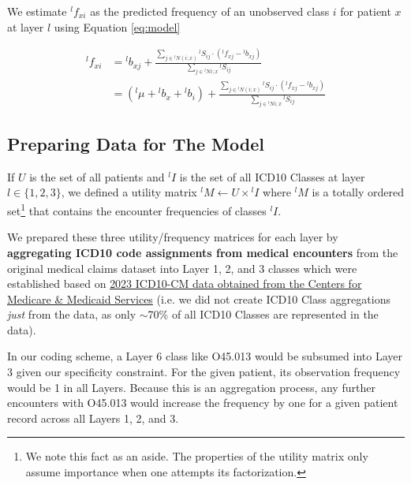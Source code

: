 \documentclass[twoside,11pt]{article}
\begin{document}
{We estimate ${}^{l}f_{xi}$ as the predicted frequency of an unobserved class $i$ for patient $x$ at layer $l$ using Equation \ref{eq:model}

\begin{equation}
\begin{align*}
{}^{l}f_{xi}
&= {}^{l}b_{xj} + \frac{
  \sum_{j \in {}^{l}N(i;x)} {}^{l}S_{ij} \cdot ({}^{l}f_{xj} - {}^{l}b_{xj})
 }{
  \sum_{j \in {}^{l}N{i;x}} {}^{l}S_{ij}
 } \\
&= ({}^{l}\mu + {}^{l}b_x + {}^{l}b_{i}) + \frac{
  \sum_{j \in {}^{l}N(i;x)} {}^{l}S_{ij} \cdot ({}^{l}f_{xj} - {}^{l}b_{xj})
 }{
  \sum_{j \in {}^{l}N{i;x}} {}^{l}S_{ij}
 }
\end{align*}
\label{eq:model}
\end{equation}


\subsection{Preparing Data for The Model} \label{section:data-prep}

If $U$ is the set of all patients and ${}^{l}I$ is the set of all ICD10 Classes at layer $l \in \{1,2,3\}$, we defined a utility matrix ${}^{l}M \gets U \times {}^{l}I$ where ${}^{l}M$ is a totally ordered set\footnote{We note this fact as an aside. The properties of the utility matrix only assume importance when one attempts its factorization.} that contains the encounter frequencies of classes ${}^{l}I$.

We prepared these three utility/frequency matrices for each layer by \textbf{aggregating ICD10 code assignments from medical encounters} from the original medical claims dataset into Layer 1, 2, and 3 classes which were established based on \href{https://www.cms.gov/medicare/icd-10/2023-icd-10-cm}{2023 ICD10-CM data obtained from the Centers for Medicare \& Medicaid Services} (i.e. we did not create ICD10 Class aggregations \textit{just} from the data, as only $\sim$70\% of all ICD10 Classes are represented in the data).

In our coding scheme, a Layer 6 class like O45.013 would be subsumed into Layer 3 given our specificity constraint. For the given patient, its observation frequency would be 1 in all Layers. Because this is an aggregation process, any further encounters with O45.013 would increase the frequency by one for a given patient record across all Layers 1, 2, and 3.

}
\end{document}
